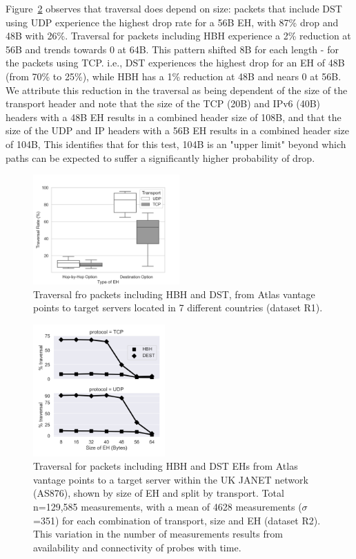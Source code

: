\documentclass[conference]{IEEEtran}
\begin{document}
Figure~\ref{fig:sizes} observes that traversal does depend on size: packets that include DST using UDP experience the highest drop rate for a 56B EH, with  87\% drop and 48B with 26\%. Traversal for packets including HBH experience a 2\% reduction at 56B and trends towards 0 at 64B.
This pattern shifted 8B for each length - for the packets  using TCP. i.e., DST experiences the highest drop for an EH of 48B (from 70\% to 25\%), while HBH has a 1\% reduction at 48B and nears 0 at 56B.
We attribute this reduction in the traversal as being dependent of the size of the transport header and note that the size of the TCP (20B) and IPv6 (40B) headers with a 48B EH results in a combined header size of 108B, and that the size of the UDP and IP headers with a 56B EH results in a combined header size of 104B, This identifies that for this test,  104B is an "upper limit" beyond which paths can be expected to suffer a significantly higher probability of drop.

\begin{figure}
\centering
  \includegraphics[width=0.5\textwidth]{all_traversal.png}
  \caption{Traversal fro packets including HBH and DST, from Atlas vantage points to target servers located in 7 different countries (dataset R1).}
  \label{fig:countrybox}
\end{figure}

\begin{figure}
\centering
  \includegraphics[width=0.45\textwidth]{sizes.png}
  \caption{Traversal for packets including HBH and DST EHs from Atlas vantage points to a target server within the UK JANET network (AS876), shown by size of EH and split by transport.  Total n=129,585 measurements, with a mean of 4628 measurements ($\sigma$=351) for each combination of transport, size and EH  (dataset R2). This variation in the number of measurements results from availability and connectivity of  probes with time.}
  \label{fig:sizes}
\end{figure}
\end{document}
